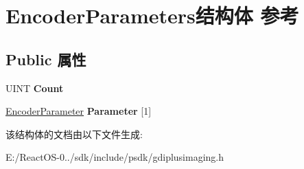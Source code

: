 \hypertarget{struct_encoder_parameters}{}\section{Encoder\+Parameters结构体 参考}
\label{struct_encoder_parameters}
\subsection*{Public 属性}
\begin{DoxyCompactItemize}
\item 
\mbox{\label{struct_encoder_parameters_a118b9ad39f973077d91a6f5a3f16824a}} 
U\+I\+NT {\bfseries Count}
\item 
\mbox{\label{struct_encoder_parameters_a29c333d927f822431bd4b0a3a6d69f90}} 
\hyperlink{struct_encoder_parameter}{Encoder\+Parameter} {\bfseries Parameter} \mbox{[}1\mbox{]}
\end{DoxyCompactItemize}


该结构体的文档由以下文件生成\+:\begin{DoxyCompactItemize}
\item 
E\+:/\+React\+O\+S-\/0../sdk/include/psdk/gdiplusimaging.\+h\end{DoxyCompactItemize}
